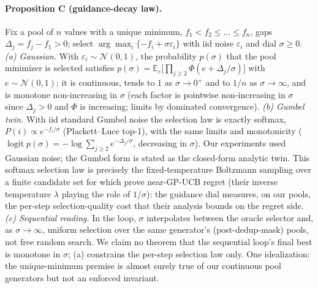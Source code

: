\documentclass[%
 aip,
 amsmath,amssymb,
 floatfix,
 reprint,%
]{revtex4-1}
\begin{document}
\paragraph{Proposition C (guidance-decay law).}
Fix a pool of $n$ values with a unique minimum,
$f_1 < f_2 \le \dots \le f_n$, gaps $\Delta_j = f_j - f_1 > 0$; select
$\arg\max_i \{-f_i + \sigma \varepsilon_i\}$ with iid noise
$\varepsilon_i$ and dial $\sigma \ge 0$.
\emph{(a) Gaussian.} With $\varepsilon_i \sim \mathcal N(0,1)$, the
probability $p(\sigma)$ that the pool minimizer is selected satisfies
$p(\sigma) = \mathbb{E}_{e}\bigl[\prod_{j\ge2}
\Phi(e + \Delta_j/\sigma)\bigr]$ with $e \sim \mathcal N(0,1)$; it is
continuous, tends to $1$ as $\sigma \to 0^{+}$ and to $1/n$ as
$\sigma \to \infty$, and is monotone non-increasing in $\sigma$ (each
factor is pointwise non-increasing in $\sigma$ since $\Delta_j > 0$ and
$\Phi$ is increasing; limits by dominated convergence).
\emph{(b) Gumbel twin.} With iid standard Gumbel noise the selection law
is exactly softmax, $P(i) \propto e^{-f_i/\sigma}$ (Plackett--Luce
top-1), with the same limits and monotonicity
($\operatorname{logit} p(\sigma) = -\log \sum_{j\ge2}
e^{-\Delta_j/\sigma}$, decreasing in $\sigma$). Our experiments used
Gaussian noise; the Gumbel form is stated as the closed-form analytic
twin. This softmax selection law is precisely the fixed-temperature
Boltzmann sampling over a finite candidate set for which
\citet{bloor2026b3o} prove near-GP-UCB regret (their inverse temperature
$\lambda$ playing the role of $1/\sigma$): the guidance dial measures,
on our pools, the per-step selection-quality cost that their analysis
bounds on the regret side.
\emph{(c) Sequential reading.} In the loop, $\sigma$ interpolates
between the oracle selector and, as $\sigma \to \infty$, uniform
selection over the same generator's (post-dedup-mask) pools, not free
random search. We claim no theorem that the sequential loop's
final best is monotone in $\sigma$; (a) constrains the per-step
selection law only. One idealization: the unique-minimum premise is
almost surely true of our continuous pool generators but not an enforced
invariant.
\end{document}
